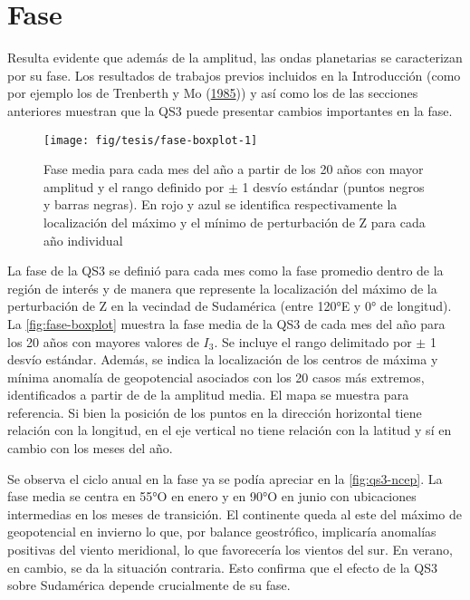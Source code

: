\documentclass[spanish,a4paper,12pt]{book}
\begin{document}
\section{Fase}\label{fase}

Resulta evidente que además de la amplitud, las ondas planetarias se
caracterizan por su fase. Los resultados de trabajos previos incluidos
en la Introducción (como por ejemplo los de Trenberth y Mo
(\protect\hyperlink{ref-Trenberth1985}{1985})) y así como los de las
secciones anteriores muestran que la QS3 puede presentar cambios
importantes en la fase.

\begin{landscape}\begin{figure}

{\centering \texttt{[image: fig/tesis/fase-boxplot-1]} 

}

\caption{Fase media para cada mes del año a partir de los 20 años con mayor amplitud y el rango definido por $\pm$ 1 desvío estándar  (puntos negros y barras negras). En rojo y azul se identifica respectivamente la localización del máximo y el mínimo de perturbación de Z para cada año individual}\label{fig:fase-boxplot}
\end{figure}
\end{landscape}

La fase de la QS3 se definió para cada mes como la fase promedio dentro
de la región de interés y de manera que represente la localización del
máximo de la perturbación de Z en la vecindad de Sudamérica (entre 120°E
y 0° de longitud). La \autoref{fig:fase-boxplot} muestra la fase media
de la QS3 de cada mes del año para los 20 años con mayores valores de
\(I_3\). Se incluye el rango delimitado por \(\pm\) 1 desvío estándar.
Además, se indica la localización de los centros de máxima y mínima
anomalía de geopotencial asociados con los 20 casos más extremos,
identificados a partir de de la amplitud media. El mapa se muestra para
referencia. Si bien la posición de los puntos en la dirección horizontal
tiene relación con la longitud, en el eje vertical no tiene relación con
la latitud y sí en cambio con los meses del año.

Se observa el ciclo anual en la fase ya se podía apreciar en la
\autoref{fig:qs3-ncep}. La fase media se centra en 55°O en enero y en
90°O en junio con ubicaciones intermedias en los meses de transición. El
continente queda al este del máximo de geopotencial en invierno lo que,
por balance geostrófico, implicaría anomalías positivas del viento
meridional, lo que favorecería los vientos del sur. En verano, en
cambio, se da la situación contraria. Esto confirma que el efecto de la
QS3 sobre Sudamérica depende crucialmente de su fase.
\end{document}
